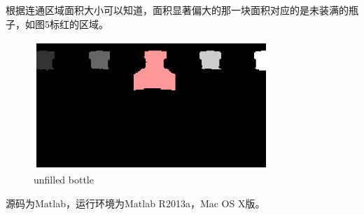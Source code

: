 \documentclass[UTF8]{ctexart}
\begin{document}
根据连通区域面积大小可以知道，面积显著偏大的那一块面积对应的是未装满的瓶子，如图5标红的区域。\par
\begin{figure}[htbp]
\centerline{\includegraphics[width=3.5in]{empty.eps}}
\caption[]{unfilled bottle}
\end{figure}\par
源码为Matlab，运行环境为Matlab R2013a，Mac OS X版。
\end{document}
